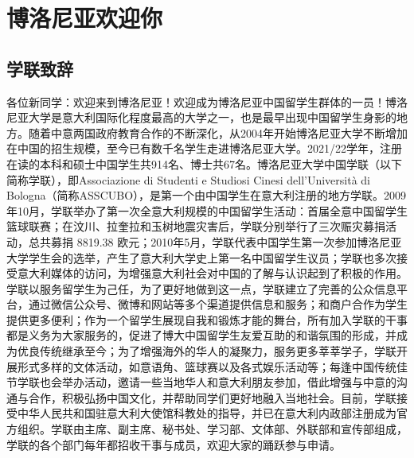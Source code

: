 
% 


\chapter{博洛尼亚欢迎你}                 %

\section{学联致辞}

各位新同学：欢迎来到博洛尼亚！欢迎成为博洛尼亚中国留学生群体的一员！博洛尼亚大学是意大利国际化程度最高的大学之一，也是最早出现中国留学生身影的地方。随着中意两国政府教育合作的不断深化，从2004年开始博洛尼亚大学不断增加在中国的招生规模，至今已有数千名学生走进博洛尼亚大学。2021/22学年，注册在读的本科和硕士中国学生共914名、博士共67名。博洛尼亚大学中国学联（以下简称学联），即Associazione di Studenti e Studiosi Cinesi dell'Università di Bologna（简称ASSCUBO），是第一个由中国学生在意大利注册的地方学联。2009年10月，学联举办了第一次全意大利规模的中国留学生活动：首届全意中国留学生篮球联赛；在汶川、拉奎拉和玉树地震灾害后，学联分别举行了三次赈灾募捐活动，总共募捐 8819.38 欧元；2010年5月，学联代表中国学生第一次参加博洛尼亚大学学生会的选举，产生了意大利大学史上第一名中国留学生议员；学联也多次接受意大利媒体的访问，为增强意大利社会对中国的了解与认识起到了积极的作用。学联以服务留学生为己任，为了更好地做到这一点，学联建立了完善的公众信息平台，通过微信公众号、微博和网站等多个渠道提供信息和服务；和商户合作为学生提供更多便利；作为一个留学生展现自我和锻炼才能的舞台，所有加入学联的干事都是义务为大家服务的，促进了博大中国留学生友爱互助的和谐氛围的形成，并成为优良传统继承至今；为了增强海外的华人的凝聚力，服务更多莘莘学子，学联开展形式多样的文体活动，如意语角、篮球赛以及各式娱乐活动等；每逢中国传统佳节学联也会举办活动，邀请一些当地华人和意大利朋友参加，借此增强与中意的沟通与合作，积极弘扬中国文化，并帮助同学们更好地融入当地社会。目前，学联接受中华人民共和国驻意大利大使馆科教处的指导，并已在意大利内政部注册成为官方组织。学联由主席、副主席、秘书处、学习部、文体部、外联部和宣传部组成，学联的各个部门每年都招收干事与成员，欢迎大家的踊跃参与申请。

